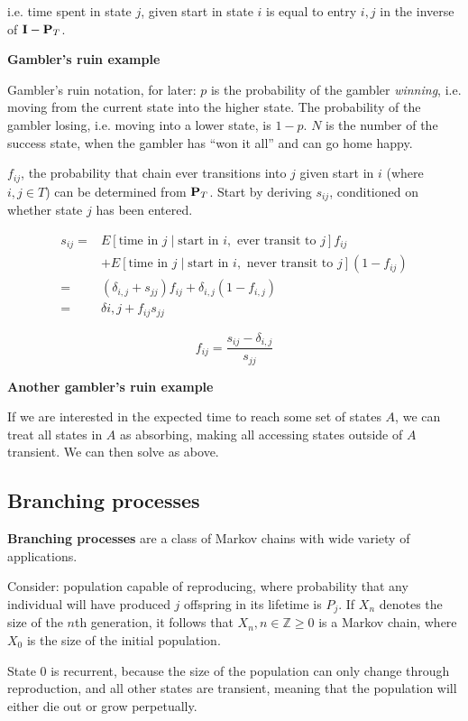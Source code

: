 \documentclass{article}
\newcommand\M[1]{\textbf{#1}}
\begin{document}
i.e. time spent in state $j$, given start in state $i$ is equal to entry
$i,j$ in the inverse of $\M I - \PT$.

\textbf{Gambler's ruin example}

Gambler's ruin notation, for later: $p$ is the probability of the
gambler \emph{winning}, i.e. moving from the current state into the
higher state. The probability of the gambler losing, i.e. moving into a
lower state, is $1 - p$. $N$ is the number of the success state, when
the gambler has ``won it all'' and can go home happy.

$f_{ij}$, the probability that chain ever transitions into $j$ given start
in $i$ (where $i,j \in T$) can be determined from $\textbf{P}_T$. Start by
deriving $s_{ij}$, conditioned on whether state $j$ has been entered.

\begin{align*}
    s_{ij} = & E[\text{time in }j \mid \text{start in }i,\text{ ever transit to }j]
    f_{ij} \\
             & + E[\text{time in }j \mid \text{start in }i,\text{ never transit to }j]
             (1 - f_{ij}) \\
    = & (\delta_{i,j} + s_{jj})f_{ij} + \delta_{i,j}(1 - f_{i,j}) \\
    = & \delta{i,j} + f_{ij}s_{jj}
\end{align*}

\[
    f_{ij} = \frac{s_{ij} - \delta_{i,j}}{s_{jj}}
\]

\textbf{Another gambler's ruin example}

If we are interested in the expected time to reach some set of states
$A$, we can treat all states in $A$ as absorbing, making all accessing
states outside of $A$ transient. We can then solve as above.

\subsection{Branching processes}

\textbf{Branching processes} are a class of Markov chains with wide
variety of applications.

Consider: population capable of reproducing, where probability that any
individual will have produced $j$ offspring in its lifetime is $P_j$. If
$X_n$ denotes the size of the $n$th generation, it follows that $X_n,
n \in \mathbb{Z} \ge 0$ is a Markov chain, where $X_0$ is the size of
the initial population.

State 0 is recurrent, because the size of the population can only change
through reproduction, and all other states are transient, meaning that
the population will either die out or grow perpetually.
\end{document}
